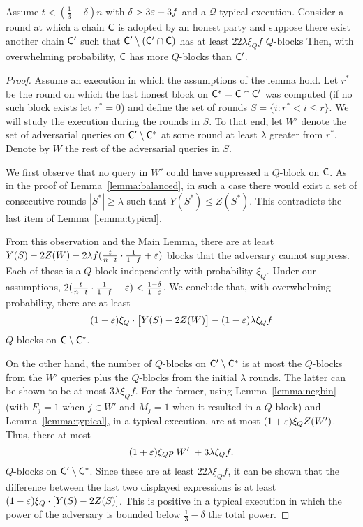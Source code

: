 \begin{lemma}\label{lemma:qblockcommonprefix}
	Assume $t<(\frac13-\delta)n$ with $\delta>3\varepsilon+3f$ and a $\mathcal{Q}$-typical
	execution.
	Consider a round at which a chain $\mathsf{C}$ is adopted by an honest party and
	suppose there exist another chain $\mathsf{C}'$ such that
	$\mathsf{C}'\setminus(\mathsf{C}'\cap\mathsf{C})$ has at least $22\lambda\xi_Qf$ $Q$-blocks
	Then, with overwhelming probability, $\mathsf{C}$ has more $Q$-blocks than $\mathsf{C}'$.
\end{lemma}
\begin{proof}
	Assume an execution in which the assumptions of the lemma hold.
	Let $r^*$ be the round on which the last honest block on
	$\mathsf{C}^*=\mathsf{C}\cap\mathsf{C}'$ was computed (if no such block exists let
	$r^*=0$) and define the set of rounds $S=\{i:r^*<i\le r\}$.
	We will study the execution during the rounds in $S$.
	To that end, let $W'$ denote the set of adversarial queries
	on $\mathsf{C}'\setminus\mathsf{C}^*$ at some round at least $\lambda$ greater from
	$r^*$. Denote by $W$ the rest of the adversarial queries in $S$.

	We first observe that no query in $W'$ could have suppressed
	a $Q$-block on $\mathsf{C}$.
	As in the proof of Lemma~\ref{lemma:balanced}, in such a case there would
	exist a set of consecutive rounds $|S^*|\ge\lambda$ such that $Y(S^*)\le
	Z(S^*)$.
	This contradicts the last item of Lemma~\ref{lemma:typical}.

	From this observation and the Main Lemma, there are at least
	$Y(S)-2Z(W)-2\lambda f(\frac t{n-t}\cdot\frac1{1-f}+\varepsilon)$
	blocks that the adversary cannot
	suppress.
	Each of these is a $Q$-block independently with probability $\xi_Q$.
	Under our assumptions,
	$2(\frac t{n-t}\cdot\frac1{1-f}+\varepsilon)<\frac{1-\delta}{1-\varepsilon}$.
	We conclude that, with overwhelming probability, there are at least
	\[
		(1-\varepsilon)\xi_Q\cdot\bigl[Y(S)-2Z(W)\bigr]-(1-\varepsilon)\lambda\xi_Qf
	\]
	$Q$-blocks on $\mathsf{C}\setminus\mathsf{C}^*$.

	On the other hand, the number of $Q$-blocks on $\mathsf{C}'\setminus\mathsf{C}^*$ is
	at most the $Q$-blocks from the $W'$ queries plus the $Q$-blocks
	from the initial $\lambda$ rounds.
	The latter can be shown to be at most $3\lambda\xi_Qf$.
	For the former, using Lemma~\ref{lemma:negbin} (with
	$F_j=1$ when $j\in W'$ and $M_j=1$ when it resulted in a $Q$-block) and
	Lemma~\ref{lemma:typical}, in a typical execution, are at most
	$(1+\varepsilon)\xi_QZ(W')$. Thus, there at most
	\[
		(1+\varepsilon)\xi_Qp|W'|+3\lambda\xi_Qf
	.\]
	$Q$-blocks on $\mathsf{C}'\setminus\mathsf{C}^*$.
	Since these are at least $22\lambda\xi_Qf$, it can be shown that
	the difference between the last two displayed expressions is at least
	$(1-\varepsilon)\xi_Q\cdot[Y(S)-2Z(S)]$. This is positive in a typical execution
	in which the power of the adversary is bounded below $\frac13-\delta$ the
	total power.
\end{proof}

